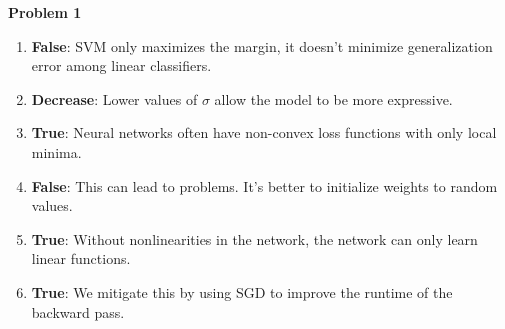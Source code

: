{\bf Problem 1}
\begin{enumerate}
    \item {\bf False}: SVM only maximizes the margin, it doesn't minimize generalization error among linear classifiers.
    \item {\bf Decrease}: Lower values of $\sigma$ allow the model to be more expressive.
    \item {\bf True}: Neural networks often have non-convex loss functions with only local minima.
    \item {\bf False}: This can lead to problems. It's better to initialize weights to random values. 
    \item {\bf True}: Without nonlinearities in the network, the network can only learn linear functions.
    \item {\bf True}: We mitigate this by using SGD to improve the runtime of the backward pass.
\end{enumerate}
